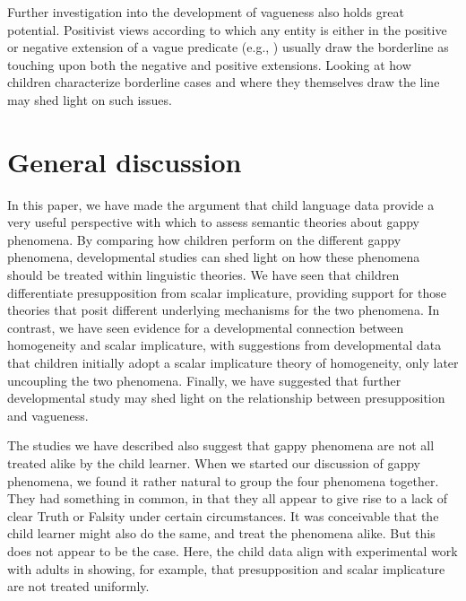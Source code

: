 \documentclass[12pt, letterpaper]{article}
\begin{document}
{Further investigation into the development of vagueness also holds great potential. Positivist views according to which any entity is either in the positive or negative extension of a vague predicate (e.g., \citealt{williamson1994:vagueness}) usually draw the borderline as touching upon both the negative and positive extensions. Looking at how children characterize borderline cases and where they themselves draw the line may shed light on such issues.


\section{General discussion}\label{discussion}

In this paper, we have made the argument that child language data provide a very useful perspective with which to assess semantic theories about gappy phenomena. By comparing how children perform on the different gappy phenomena, developmental studies can shed light on how these phenomena should be treated within linguistic theories. We have seen that children differentiate presupposition from scalar implicature, providing support for those theories that posit different underlying mechanisms for the two phenomena. In contrast, we have seen evidence for a developmental connection between homogeneity and scalar implicature, with suggestions from developmental data that children initially adopt a scalar implicature theory of homogeneity, only later uncoupling the two phenomena. Finally, we have suggested that further developmental study may shed light on the relationship between presupposition and vagueness. 

The studies we have described also suggest that gappy phenomena are not all treated alike by the child learner. When we started our discussion of gappy phenomena, we found it rather natural to group the four phenomena together. They had something in common, in that they all appear to give rise to a lack of clear Truth or Falsity under certain circumstances. It was conceivable that the child learner might also do the same, and treat the phenomena alike. But this does not appear to be the case. Here, the child data align with experimental work with adults in showing, for example, that presupposition and scalar implicature are not treated uniformly.

}
\end{document}
